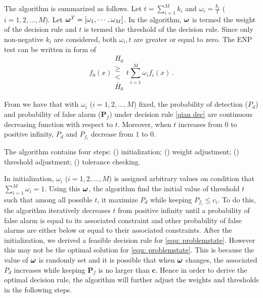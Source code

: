 The algorithm is summarized as follows. Let $t = \sum_{i=1}^{M}k_i$ and $\omega_i = \frac{k_i}{t}$ ($i=1, 2, ..., M$).
Let $\boldsymbol{\omega}^T = [\omega_1, \cdots, \omega_M]$. 
In the algorithm, $\boldsymbol{\omega}$ is termed the weight of the decision rule and $t$ is termed the threshold of the decision rule. Since only non-negative $k_i$ are considered, both $\omega_i, t$ are greater or equal to zero. The ENP test can be written in form of 
\begin{equation}
\label{qian dec}
f_0(x) \substack{H_0 \\ \geq \\ < \\ \bar{H}_0} t\sum_{i=1}^{M}\omega_if_i(x)\,.
\end{equation}

From \cite{zhang2000efficient} we have that with $\omega_i$ ($i=1, 2, ..., M$) fixed, the probability of detection ($P_d$) and probability of false alarm ($\mathbf{P}_f$) under decision rule \eqref{qian dec} are continuous decreasing function with respect to $t$. 
Moreover, when $t$ increases from $0$ to positive infinity, $P_d$ and $P_{f_i}$ decrease from $1$ to $0$.

The algorithm contains four steps: () initialization; () weight adjustment; () threshold adjustment; () tolerance checking.

In initialization, $\omega_i$ ($i=1, 2, ..., M$)  is assigned arbitrary values on condition that $\sum_{i=1}^{M}\omega_i = 1$. Using this $\boldsymbol{\omega}$, the algorithm find the initial value of threshold $t$ such that among all possible $t$, it maximize $P_d$ while keeping $P_{f_i} \leq c_i$. 
To do this, the algorithm iteratively decreases $t$ from positive infinity until a probability of false alarm is equal to its associated constraint and other probability of false alarms are either below or equal to their associated constraints.   
After the initialization, we derived a feasible decision rule for \eqref{equ: problemstate}. However this may not be the optimal solution for \eqref{equ: problemstate}. This is because the value of $\boldsymbol{\omega}$ is randomly set and it is possible that when $\boldsymbol{\omega}$ changes, the associated $P_d$ increases while keeping $\mathbf{P}_f$ is no larger than $\mathbf{c}$. Hence in order to derive the optimal decision rule, the algorithm will further adjust the weights and thresholds in the following steps. 

